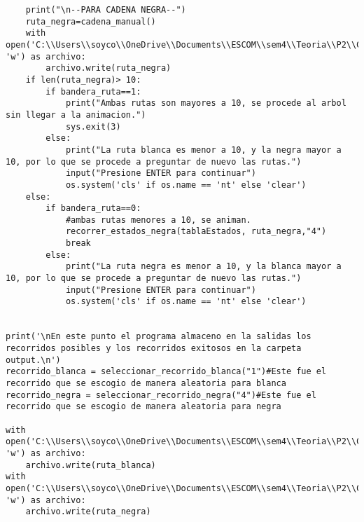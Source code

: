 \begin{lstlisting}
    print("\n--PARA CADENA NEGRA--")
    ruta_negra=cadena_manual()
    with open('C:\\Users\\soyco\\OneDrive\\Documents\\ESCOM\\sem4\\Teoria\\P2\\Chess\\output\\ruta_negra.txt', 'w') as archivo:
        archivo.write(ruta_negra)
    if len(ruta_negra)> 10:
        if bandera_ruta==1:
            print("Ambas rutas son mayores a 10, se procede al arbol sin llegar a la animacion.")
            sys.exit(3)
        else:
            print("La ruta blanca es menor a 10, y la negra mayor a 10, por lo que se procede a preguntar de nuevo las rutas.")
            input("Presione ENTER para continuar")
            os.system('cls' if os.name == 'nt' else 'clear')
    else:
        if bandera_ruta==0:
            #ambas rutas menores a 10, se animan.
            recorrer_estados_negra(tablaEstados, ruta_negra,"4")
            break
        else:
            print("La ruta negra es menor a 10, y la blanca mayor a 10, por lo que se procede a preguntar de nuevo las rutas.")
            input("Presione ENTER para continuar")
            os.system('cls' if os.name == 'nt' else 'clear')


print('\nEn este punto el programa almaceno en la salidas los recorridos posibles y los recorridos exitosos en la carpeta output.\n')
recorrido_blanca = seleccionar_recorrido_blanca("1")#Este fue el recorrido que se escogio de manera aleatoria para blanca
recorrido_negra = seleccionar_recorrido_negra("4")#Este fue el recorrido que se escogio de manera aleatoria para negra

with open('C:\\Users\\soyco\\OneDrive\\Documents\\ESCOM\\sem4\\Teoria\\P2\\Chess\\output\\ruta_blanca.txt', 'w') as archivo:
    archivo.write(ruta_blanca)
with open('C:\\Users\\soyco\\OneDrive\\Documents\\ESCOM\\sem4\\Teoria\\P2\\Chess\\output\\ruta_negra.txt', 'w') as archivo:
    archivo.write(ruta_negra)


\end{lstlisting}
